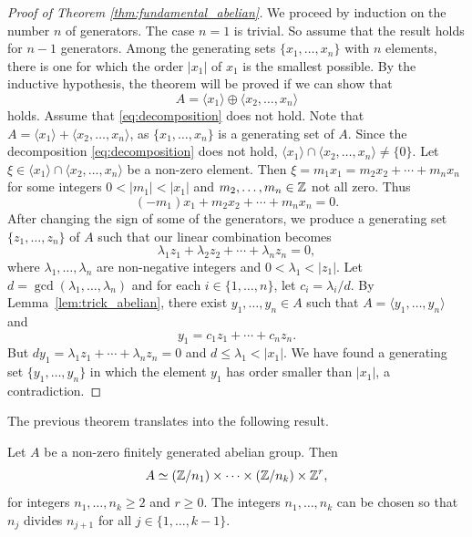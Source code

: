 \begin{proof}[Proof of Theorem \ref{thm:fundamental_abelian}]
    We proceed by induction on the number $n$ of generators. The case $n=1$ is trivial. So assume that the result holds for $n-1$ generators. 
    Among the generating sets $\{x_1,\dots,x_n\}$ 
    with $n$ elements, there is one 
    for which the order $|x_1|$ of $x_1$ is the smallest possible. By the inductive hypothesis, 
    the theorem will be proved if we can show that 
    \begin{equation}
    \label{eq:decomposition}
    A=\langle x_1\rangle\oplus \langle x_2,\dots,x_n\rangle
    \end{equation}
    holds. 
    Assume that \eqref{eq:decomposition} does not hold. 
    Note that 
    $A=\langle x_1\rangle+\langle x_2,\dots,x_n\rangle$, as 
    $\{x_1,\dots,x_n\}$ is a generating set of $A$. Since
    the decomposition  
    \eqref{eq:decomposition} does not hold, 
    $\langle x_1\rangle\cap \langle x_2,\dots,x_n\rangle\ne\{0\}$. Let  
    $\xi\in \langle x_1\rangle\cap \langle x_2,\dots,x_n\rangle$ be a non-zero element. Then 
    $\xi=m_1x_1=m_2x_2+\cdots+m_nx_n$ for some integers  
    $0<|m_1|<|x_1|$ 
    and $m_2,\dots,m_n\in\mathbb{Z}$ not all zero.  Thus 
    \[ 
    (-m_1)x_1+m_2x_2+\cdots+m_nx_n=0.
    \]
    After changing the sign of some of the generators, 
    we produce a generating set $\{z_1,\dots,z_n\}$ of $A$ 
    such that our linear combination becomes 
    \[ 
    \lambda_1z_1+\lambda_2z_2+\cdots+\lambda_nz_n=0, 
    \]
    where $\lambda_1,\dots,\lambda_n$ are non-negative integers  
    and $0<\lambda_1<|z_1|$. Let $d=\gcd(\lambda_1,\dots,\lambda_n)$ and
    for each $i\in\{1,\dots,n\}$, let 
    $c_i=\lambda_i/d$. 
    By Lemma~\ref{lem:trick_abelian}, there exist 
    $y_1,\dots,y_n\in A$ such that 
    $A=\langle y_1,\dots,y_n\rangle$ and 
    \[ 
    y_1=c_1z_1+\cdots+c_nz_n.
    \]
    But $dy_1=\lambda_1z_1+\cdots+\lambda_nz_n=0$ and 
    $d\leq \lambda_1<|x_1|$. We have found a generating set 
    $\{y_1,\dots,y_n\}$ in which the element
    $y_1$ has order smaller than $|x_1|$, a contradiction. 
\end{proof}

The previous theorem 
translates into the following result.

\begin{theorem}
\label{thm:abelian_factors}
    Let $A$ be a non-zero finitely generated 
    abelian group. Then 
    \[
    A\simeq (\mathbb{Z}/{n_1})\times\cdots\times (\mathbb{Z}/{n_k})\times\mathbb{Z}^r,
    \]
    for integers $n_1,\dots,n_k\geq2$ and 
    $r\geq0$. The integers
    $n_1,\dots,n_k$ 
    can be chosen so that 
    $n_j$ divides $n_{j+1}$ for all $j\in\{1,\dots,k-1\}$. 
\end{theorem}

